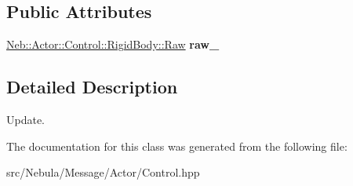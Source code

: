 \subsection*{\-Public \-Attributes}
\begin{DoxyCompactItemize}
\item 
\hypertarget{classNeb_1_1Message_1_1Actor_1_1Control_1_1RigidBody_1_1Update_a6a5321d0c2f8d56fc8520285d7b6c5bb}{\hyperlink{classNeb_1_1Actor_1_1Control_1_1RigidBody_1_1Raw}{\-Neb\-::\-Actor\-::\-Control\-::\-Rigid\-Body\-::\-Raw} {\bfseries raw\-\_\-}}\label{classNeb_1_1Message_1_1Actor_1_1Control_1_1RigidBody_1_1Update_a6a5321d0c2f8d56fc8520285d7b6c5bb}

\end{DoxyCompactItemize}


\subsection{\-Detailed \-Description}
\-Update. 

\-The documentation for this class was generated from the following file\-:\begin{DoxyCompactItemize}
\item 
src/\-Nebula/\-Message/\-Actor/\-Control.\-hpp\end{DoxyCompactItemize}
